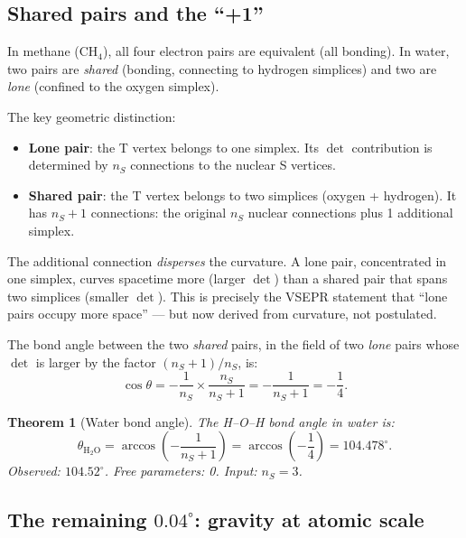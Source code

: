 \documentclass[12pt]{article}
\newtheorem{theorem}{Theorem}[section]
\theoremstyle{remark}
\begin{document}
\subsection{Shared pairs and the ``+1''}

In methane (CH$_4$), all four electron pairs are equivalent (all bonding). In water, two pairs are \emph{shared} (bonding, connecting to hydrogen simplices) and two are \emph{lone} (confined to the oxygen simplex).

The key geometric distinction:
\begin{itemize}
\item \textbf{Lone pair}: the T vertex belongs to one simplex. Its $\det$ contribution is determined by $n_S$ connections to the nuclear S vertices.
\item \textbf{Shared pair}: the T vertex belongs to two simplices (oxygen + hydrogen). It has $n_S + 1$ connections: the original $n_S$ nuclear connections plus 1 additional simplex.
\end{itemize}

The additional connection \emph{disperses} the curvature. A lone pair, concentrated in one simplex, curves spacetime more (larger $\det$) than a shared pair that spans two simplices (smaller $\det$). This is precisely the VSEPR statement that ``lone pairs occupy more space'' --- but now derived from curvature, not postulated.

The bond angle between the two \emph{shared} pairs, in the field of two \emph{lone} pairs whose $\det$ is larger by the factor $(n_S + 1)/n_S$, is:
\begin{equation}
\cos\theta = -\frac{1}{n_S} \times \frac{n_S}{n_S + 1} = -\frac{1}{n_S + 1} = -\frac{1}{4}.
\end{equation}

\begin{theorem}[Water bond angle]
The H--O--H bond angle in water is:
\begin{equation}
\theta_{\text{H}_2\text{O}} = \arccos\!\left(-\frac{1}{n_S + 1}\right) = \arccos\!\left(-\frac{1}{4}\right) = 104.478^\circ.
\end{equation}
Observed: $104.52^\circ$. Free parameters: 0. Input: $n_S = 3$.
\end{theorem}

\subsection{The remaining $0.04^\circ$: gravity at atomic scale}
\end{document}
